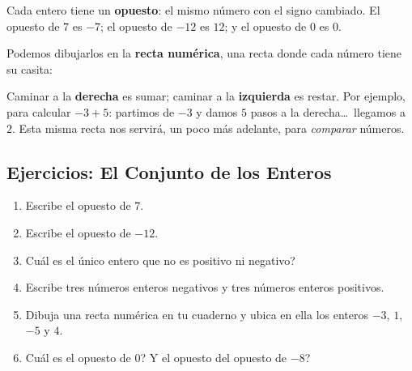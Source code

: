 \documentclass[12pt, letterpaper]{article}
\begin{document}
\noindent Cada entero tiene un \textbf{opuesto}: el mismo número con el signo cambiado. El opuesto de $7$ es $-7$; el opuesto de $-12$ es $12$; y el opuesto de $0$ es $0$.

\noindent Podemos dibujarlos en la \textbf{recta numérica}, una recta donde cada número tiene su casita:

\begin{center}
\end{center}

\noindent Caminar a la \textbf{derecha} es sumar; caminar a la \textbf{izquierda} es restar. Por ejemplo, para calcular $-3 + 5$: partimos de $-3$ y damos $5$ pasos a la derecha\ldots\ llegamos a $2$. Esta misma recta nos servirá, un poco más adelante, para \emph{comparar} números.

\subsection{Ejercicios: El Conjunto de los Enteros}

\begin{enumerate}[leftmargin=*]
  \item \facil{} Escribe el opuesto de $7$.

  \item \facil{} Escribe el opuesto de $-12$.

  \item \facil{} \textquestiondown Cuál es el único entero que no es positivo ni negativo?

  \item \facil{} Escribe tres números enteros negativos y tres números enteros positivos.

  \item \medio{} Dibuja una recta numérica en tu cuaderno y ubica en ella los enteros $-3$, $1$, $-5$ y $4$.

  \item \medio{} \textquestiondown Cuál es el opuesto de $0$? \textquestiondown Y el opuesto del opuesto de $-8$?
\end{enumerate}

\newpage

\end{document}

